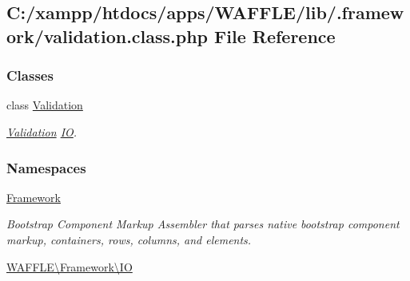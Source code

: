 \hypertarget{validation_8class_8php}{}\subsection{C\+:/xampp/htdocs/apps/\+W\+A\+F\+F\+L\+E/lib/.framework/validation.class.\+php File Reference}
\label{validation_8class_8php}
\subsubsection*{Classes}
\begin{DoxyCompactItemize}
\item 
class \hyperlink{class_w_a_f_f_l_e_1_1_framework_1_1_i_o_1_1_validation}{Validation}
\begin{DoxyCompactList}\small\item\em \hyperlink{class_w_a_f_f_l_e_1_1_framework_1_1_i_o_1_1_validation}{Validation} \hyperlink{namespace_w_a_f_f_l_e_1_1_framework_1_1_i_o}{IO}. \end{DoxyCompactList}\end{DoxyCompactItemize}
\subsubsection*{Namespaces}
\begin{DoxyCompactItemize}
\item 
 \hyperlink{namespace_framework}{Framework}
\begin{DoxyCompactList}\small\item\em Bootstrap Component Markup Assembler that parses native bootstrap component markup, containers, rows, columns, and elements. \end{DoxyCompactList}\item 
 \hyperlink{namespace_w_a_f_f_l_e_1_1_framework_1_1_i_o}{W\+A\+F\+F\+L\+E\textbackslash{}\+Framework\textbackslash{}\+IO}
\end{DoxyCompactItemize}
